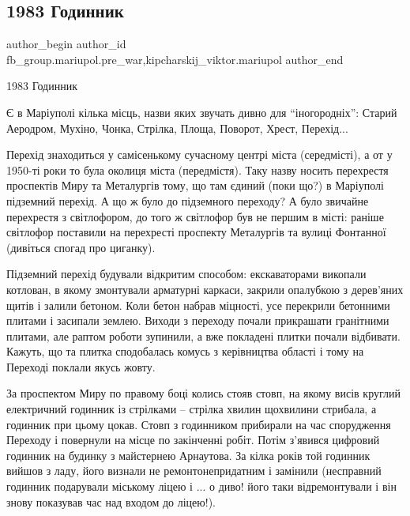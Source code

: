  
 
 
 
 

\subsection{1983 Годинник}
\label{sec:21_02_2023.fb.fb_group.mariupol.pre_war.1.1983_godinnik}
 
\ifcmt
 author_begin
   author_id fb_group.mariupol.pre_war,kipcharskij_viktor.mariupol
 author_end
\fi

1983 Годинник

Є в Маріуполі кілька місць, назви яких звучать дивно для \enquote{іногородніх}:
Старий Аеродром, Мухіно, Чонка, Стрілка, Площа, Поворот, Хрест, Перехід...

Перехід знаходиться у самісенькому сучасному центрі міста (середмісті), а от
у 1950-ті роки то була околиця міста (передмістя). Таку назву носить
перехрестя проспектів Миру та Металургів тому, що там єдиний (поки що?) в
Маріуполі підземний перехід. А що ж було до підземного переходу? А було
звичайне перехрестя з світлофором, до того ж світлофор був не першим в
місті: раніше світлофор поставили на перехресті проспекту Металургів та
вулиці Фонтанної (дивіться спогад про циганку).

Підземний перехід будували відкритим способом: екскаваторами викопали
котлован, в якому змонтували арматурні каркаси, закрили опалубкою з
дерев’яних щитів і залили бетоном. Коли бетон набрав міцності, усе перекрили
бетонними плитами і засипали землею. Виходи з переходу почали прикрашати
гранітними плитами, але раптом роботи зупинили, а вже покладені плитки
почали відбивати. Кажуть, що та плитка сподобалась комусь з керівництва
області і тому на Переході поклали якусь жовту.

За проспектом Миру по правому боці колись стояв стовп, на якому висів
круглий електричний годинник із стрілками – стрілка хвилин щохвилини
стрибала, а годинник при цьому цокав.   Стовп з годинником прибирали на час
спорудження Переходу і повернули на місце по закінченні робіт. Потім
з’явився цифровий годинник на будинку з майстернею Арнаутова. За кілка років
той годинник вийшов з ладу, його визнали не ремонтонепридатним і замінили
(несправний годинник подарували міському ліцею і ... о диво! його таки
відремонтували і він знову показував час над входом до ліцею!).

